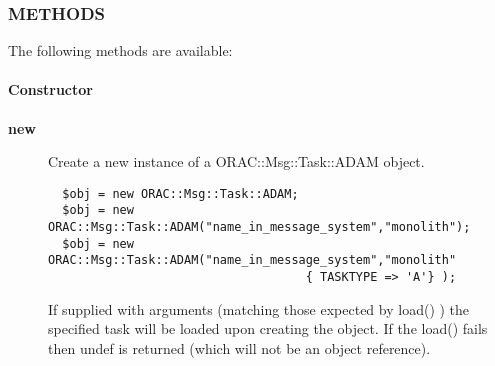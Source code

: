 \subsubsection*{METHODS\label{ORAC::Msg::Task::ADAM_METHODS}}


The following methods are available:

\paragraph*{Constructor\label{ORAC::Msg::Task::ADAM_Constructor}}
\begin{description}

\item[\textbf{new}] \mbox{}

Create a new instance of a ORAC::Msg::Task::ADAM object.

\begin{verbatim}
  $obj = new ORAC::Msg::Task::ADAM;
  $obj = new ORAC::Msg::Task::ADAM("name_in_message_system","monolith");
  $obj = new ORAC::Msg::Task::ADAM("name_in_message_system","monolith"
                                    { TASKTYPE => 'A'} );
\end{verbatim}


If supplied with arguments (matching those expected by load() ) the
specified task will be loaded upon creating the object. If the load()
fails then undef is returned (which will not be an object reference).

\end{description}
